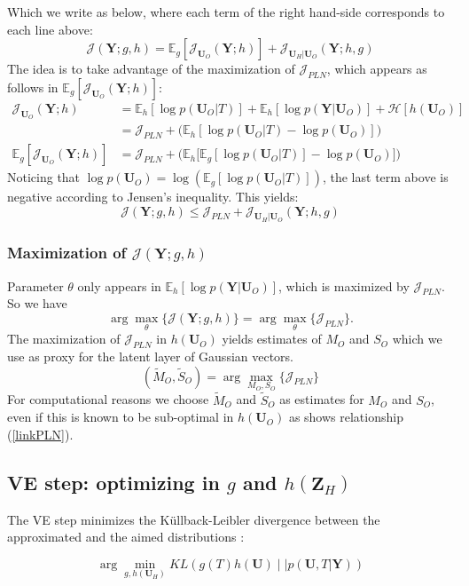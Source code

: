 \documentclass[11pt,a4paper]{article}
\newcommand{\argmin}{\arg\!\min}
\newcommand{\argmax}{\arg\!\max}
\newcommand{\entr}{\mathcal{H}}
\newcommand{\Ybf}{\boldsymbol{Y}}
\newcommand{\Zbf}{\boldsymbol{Z}}
\newcommand{\Ubf}{\boldsymbol{U}}
\newcommand{\Esp}{\mathds{E}}
\begin{document}
Which we write as below, where each term of the right hand-side corresponds to each line above:
$$\mathcal{J}(\Ybf; g,h)= \Esp_g[\mathcal{J}_{\Ubf_O}(\Ybf;h)] + \mathcal{J}_{\Ubf_H|\Ubf_O}(\Ybf;h,g)$$
The idea is to take advantage of the maximization of  $\mathcal{J}_{PLN}$, which appears as follows in $\Esp_g[\mathcal{J}_{\Ubf_O}(\Ybf;h)] $:
\begin{align*}
\mathcal{J}_{\Ubf_O}(\Ybf;h) &= \Esp_h[\log p(\Ubf_O|T)] + \Esp_h[\log p(\Ybf|\Ubf_O)]+\entr[h(\Ubf_O)]\\
&= \mathcal{J}_{PLN} + \big(\Esp_h[\log p(\Ubf_O|T)-\log p(\Ubf_O) ]\big)\\
\Esp_g[\mathcal{J}_{\Ubf_O}(\Ybf;h)] &= \mathcal{J}_{PLN} + \Big(\Esp_h\big[\Esp_g[\log p(\Ubf_O|T)]-\log p(\Ubf_O) \big]\Big)
\end{align*}
Noticing that $\log p(\Ubf_O) = \log (\Esp_g[ \log p(\Ubf_O|T)])$, the last term above is negative according to Jensen's inequality. This yields:
\begin{equation}
\label{linkPLN}
\mathcal{J}(\Ybf; g,h)\leq \mathcal{J}_{PLN}+ \mathcal{J}_{\Ubf_H|\Ubf_O}(\Ybf;h,g)
\end{equation}
 \subsubsection{Maximization of $\mathcal{J}(\Ybf; g,h)$}
Parameter $\theta$ only appears in $\Esp_h[\log p(\Ybf|\Ubf_O)]$, which is  maximized by $\mathcal{J}_{PLN}$. So we have
$$\argmax_{\theta}\Big\{\mathcal{J}(\Ybf; g,h)\Big\} = \argmax_{\theta}\Big\{\mathcal{J}_{PLN}\Big\}. $$
The maximization of $\mathcal{J}_{PLN}$ in $h(\Ubf_O)$ yields estimates of $M_O$ and $S_O$ which we use as proxy for the latent layer of Gaussian vectors.
$$ (\tilde{M}_O, \tilde{S}_O) = \argmax_{M_O,S_O}\Big\{\mathcal{J}_{PLN}\Big\} $$
For computational reasons we choose $\tilde{M}_O $ and $\tilde{S}_O$ as estimates for $M_O$ and $S_O$, even if this is known to be sub-optimal in $h(\Ubf_O)$ as shows relationship (\ref{linkPLN}).

\subsection{VE step: optimizing in $g$ and $h(\Zbf_H)$}
The VE step minimizes the Küllback-Leibler divergence between the approximated and the aimed distributions :

$$  \argmin_{g,h(\Ubf_H)} KL\left(g(T)h(\Ubf) \mid\mid p(\Ubf,T|\Ybf)\right)$$
\end{document}
